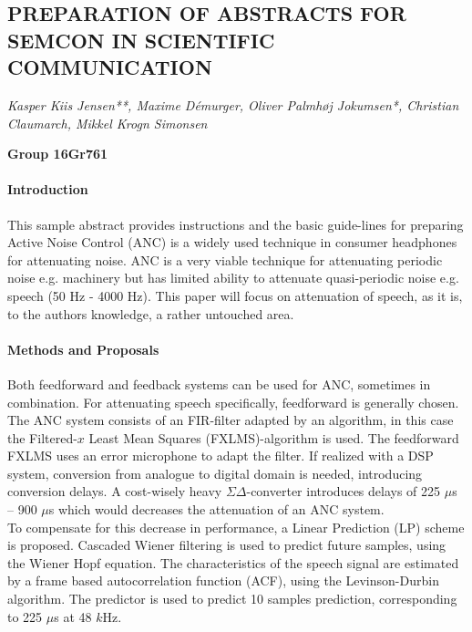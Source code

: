 \documentclass[a4paper]{article}
\title{}
\begin{document}
	
	{\centering
		\subsection*{PREPARATION OF ABSTRACTS FOR SEMCON IN SCIENTIFIC COMMUNICATION}}
	
	{\centering
		\textit{Kasper Kiis Jensen**, Maxime Démurger, Oliver Palmhøj Jokumsen*, Christian Claumarch, Mikkel Krogn Simonsen}
		\par}
	{\centering
		\textbf{Group 16Gr761}
		\par}
	
	
	\bigskip
	
	\paragraph{Introduction}
	This sample abstract provides instructions and the basic guide-lines for preparing 	Active Noise Control (ANC) is a widely used technique in consumer headphones for attenuating noise. ANC is a very viable technique for attenuating periodic noise e.g. machinery but has limited ability to attenuate quasi-periodic noise e.g. speech (50 Hz - 4000 Hz). This paper will focus on attenuation of speech, as it is, to the authors knowledge, a rather untouched area. 
	
	\paragraph{Methods and Proposals}
	Both feedforward and feedback systems can be used for ANC, sometimes in combination. For attenuating speech specifically, feedforward is generally chosen. The ANC system consists of an FIR-filter adapted by an algorithm, in this case the Filtered-$x$ Least Mean Squares (FXLMS)-algorithm is used. The feedforward FXLMS uses an error microphone to adapt the filter. 
	If realized with a DSP system, conversion from analogue to digital domain is needed, introducing conversion delays. A cost-wisely heavy $\Sigma\Delta$-converter introduces delays of 225 $\mu$s -- 900 $\mu$s which would decreases the attenuation of an ANC system. \\
	To compensate for this decrease in performance, a Linear Prediction (LP) scheme is proposed.
	Cascaded Wiener filtering is used to predict future samples, using the Wiener Hopf equation. The characteristics of the speech signal are estimated by a frame based autocorrelation function (ACF), using the Levinson-Durbin algorithm. The predictor is used to predict 10 samples prediction, corresponding to 225 $\mu$s at 48 $k$Hz.
	
\end{document}
